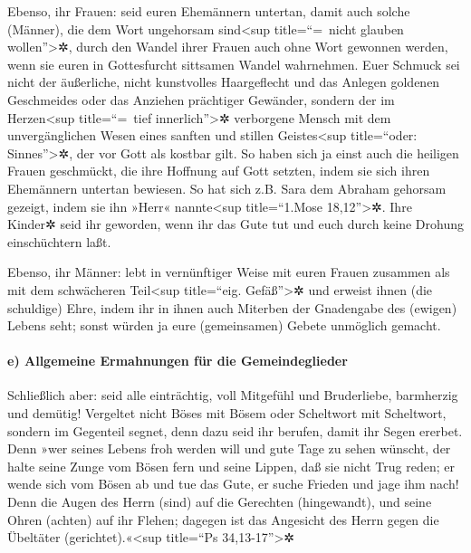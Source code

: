  Ebenso, ihr Frauen: seid euren Ehemännern untertan, damit
auch solche (Männer), die dem Wort ungehorsam sind\textless sup
title=``=~nicht glauben wollen''\textgreater✲, durch den Wandel ihrer
Frauen auch ohne Wort gewonnen werden,  wenn sie euren in
Gottesfurcht sittsamen Wandel wahrnehmen.  Euer Schmuck
sei nicht der äußerliche, nicht kunstvolles Haargeflecht und das Anlegen
goldenen Geschmeides oder das Anziehen prächtiger Gewänder,
 sondern der im Herzen\textless sup title=``=~tief
innerlich''\textgreater✲ verborgene Mensch mit dem unvergänglichen Wesen
eines sanften und stillen Geistes\textless sup title=``oder:
Sinnes''\textgreater✲, der vor Gott als kostbar gilt.  So
haben sich ja einst auch die heiligen Frauen geschmückt, die ihre
Hoffnung auf Gott setzten, indem sie sich ihren Ehemännern untertan
bewiesen.  So hat sich z.B. Sara dem Abraham gehorsam
gezeigt, indem sie ihn »Herr« nannte\textless sup title=``1.Mose
18,12''\textgreater✲. Ihre Kinder✲ seid ihr geworden, wenn ihr das Gute
tut und euch durch keine Drohung einschüchtern laßt.

 Ebenso, ihr Männer: lebt in vernünftiger Weise mit euren
Frauen zusammen als mit dem schwächeren Teil\textless sup title=``eig.
Gefäß''\textgreater✲ und erweist ihnen (die schuldige) Ehre, indem ihr
in ihnen auch Miterben der Gnadengabe des (ewigen) Lebens seht; sonst
würden ja eure (gemeinsamen) Gebete unmöglich gemacht.

\hypertarget{e-allgemeine-ermahnungen-fuxfcr-die-gemeindeglieder}{%
\paragraph{e) Allgemeine Ermahnungen für die
Gemeindeglieder}\label{e-allgemeine-ermahnungen-fuxfcr-die-gemeindeglieder}}

 Schließlich aber: seid alle einträchtig, voll Mitgefühl
und Bruderliebe, barmherzig und demütig!  Vergeltet nicht
Böses mit Bösem oder Scheltwort mit Scheltwort, sondern im Gegenteil
segnet, denn dazu seid ihr berufen, damit ihr Segen ererbet.
 Denn »wer seines Lebens froh werden will und gute Tage
zu sehen wünscht, der halte seine Zunge vom Bösen fern und seine Lippen,
daß sie nicht Trug reden;  er wende sich vom Bösen ab und
tue das Gute, er suche Frieden und jage ihm nach!  Denn
die Augen des Herrn (sind) auf die Gerechten (hingewandt), und seine
Ohren (achten) auf ihr Flehen; dagegen ist das Angesicht des Herrn gegen
die Übeltäter (gerichtet).«\textless sup title=``Ps
34,13-17''\textgreater✲

